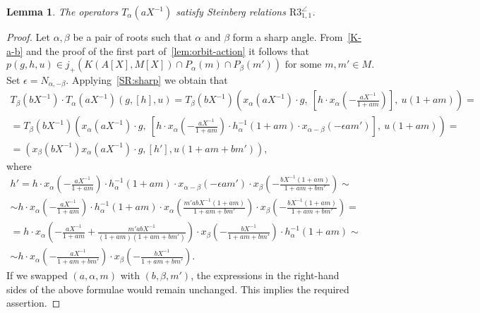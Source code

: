 \documentclass[oneside, 8pt]{amsart}
\newtheorem{lemma}{Lemma}
\theoremstyle{remark}
\theoremstyle{definition}
\numberwithin{lemma}{section}
\numberwithin{prop}{section}
\numberwithin{corollary}{section}
\numberwithin{equation}{section}
\begin{document}
\begin{lemma} \label{R3_1_1} The operators $T_\alpha(aX^{-1})$ satisfy Steinberg relations $\mathrm{R3}_{1,1}^{\angle}$. \end{lemma}
\begin{proof}
Let $\alpha, \beta$ be a pair of roots such that $\alpha$ and $\beta$ form a sharp angle.
From~\cref{K-a-b} and the proof of the first part of~\cref{lem:orbit-action} it follows that \[p(g, h, u) \in j_+\left(K(A[X], M[X]) \cap P_\alpha(m) \cap P_{\beta}(m')\right)\text{ for some }m,m' \in M.\]
Set $\epsilon = N_{\alpha,-\beta}$. Applying~\cref{SR:sharp} we obtain that
\begin{multline} \nonumber
 T_\beta(bX^{-1}) \cdot T_\alpha(aX^{-1}) \left(g, [h], u\right) = 
 T_\beta(bX^{-1}) \left(x_\alpha(aX^{-1})\cdot g,\ \left[h \cdot x_\alpha\left(-\tfrac{aX^{-1}}{1 + am}\right)\right],\ u(1 + am)\right) = \\ 
 = T_\beta(bX^{-1}) \left(x_\alpha(aX^{-1})\cdot g,\ \left[h \cdot x_\alpha\left(-\tfrac{aX^{-1}}{1 + am}\right) \cdot h^{-1}_\alpha(1 + am) \cdot x_{\alpha-\beta}(-\epsilon am')\right],\ u(1 + am)\right) = \\
 = (x_\beta(bX^{-1}) x_\alpha(aX^{-1}) \cdot g, [h'], u(1 + am + bm')), \end{multline}
where 
\begin{multline} \nonumber
 h' = h \cdot x_\alpha\left(-\tfrac{aX^{-1}}{1 + am}\right) \cdot h^{-1}_\alpha(1 + am) \cdot x_{\alpha-\beta}(-\epsilon am') \cdot x_\beta\left(-\tfrac{bX^{-1}(1+am)}{1 + am + bm'}\right) \sim \\
    \sim h \cdot x_\alpha\left(-\tfrac{aX^{-1}}{1 + am}\right) \cdot h^{-1}_\alpha(1 + am) \cdot x_{\alpha}\left(\tfrac{m'abX^{-1}(1+am)}{1 + am + bm'}\right) \cdot x_\beta\left(-\tfrac{bX^{-1}(1+am)}{1 + am + bm'}\right) = \\
 = h \cdot x_\alpha\left(-\tfrac{aX^{-1}}{1 + am} + \tfrac{m'abX^{-1}}{(1+am)(1 + am + bm')}\right) \cdot x_\beta\left(-\tfrac{bX^{-1}}{1 + am + bm'}\right) \cdot h^{-1}_\alpha(1 + am) \sim \\
 \sim h \cdot x_\alpha\left(-\tfrac{aX^{-1}}{1 + am + bm'}\right) \cdot x_\beta\left(-\tfrac{bX^{-1}}{1 + am + bm'}\right).
\end{multline}
If we swapped $(a,\alpha,m)$ with $(b,\beta,m')$, 
the expressions in the right-hand sides of the above formulae would remain unchanged. This implies the required assertion.
\end{proof}
\end{document}
